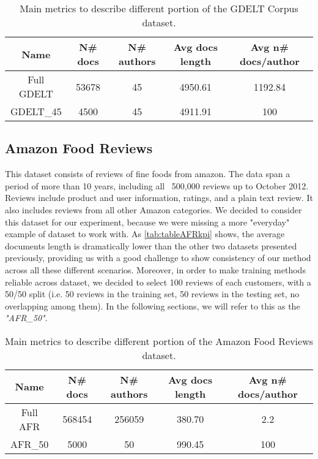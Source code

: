 \begin{table}[h!]
	\begin{center}  
		\caption[GDELT Corpus metrics]{Main metrics to describe different portion of the GDELT Corpus dataset.} 
		\label{tab:tableGDELTkpi}
		\begin{tabular}{|c | c | c | c | c |}
			\hline 
			Name & N\# docs & N\# authors & Avg docs length & Avg n\# docs/author \\
			\hline
			Full GDELT & 53678 & 45 & 4950.61 & 1192.84 \\ \hline
			GDELT\_45 & 4500 & 45 & 4911.91 & 100  \\ \hline
		\end{tabular} 
	\end{center}
\end{table}

\subsection{Amazon Food Reviews}
This dataset consists of reviews of fine foods from amazon. The data span a period of more than 10 years, including all ~500,000 reviews up to October 2012. Reviews include product and user information, ratings, and a plain text review. It also includes reviews from all other Amazon categories.
We decided to consider this dataset for our experiment, because we were missing a more "everyday" example of dataset to work with. As \autoref{tab:tableAFRkpi} shows, the average documents length is dramatically lower than the other two datasets presented previously, providing us with a good challenge to show consistency of our method across all these different scenarios.
Moreover, in order to make training methods reliable across dataset, we decided to select 100 reviews of each customers, with a 50/50 split (i.e. 50 reviews in the training set, 50 reviews in the testing set, no overlapping among them). In the following sections, we will refer to this as the \textit{"AFR\_50"}.

\begin{table}[h!]
	\begin{center}  
		\caption[Amazon Food Reviews Corpus metrics]{Main metrics to describe different portion of the Amazon Food Reviews dataset.} 
		\label{tab:tableAFRkpi}
		\begin{tabular}{|c | c | c | c | c |}
			\hline 
			Name & N\# docs & N\# authors & Avg docs length & Avg n\# docs/author \\
			\hline
			Full AFR & 568454 & 256059 & 380.70 & 2.2 \\ \hline
			AFR\_50 & 5000 & 50 & 990.45 & 100  \\ \hline
		\end{tabular} 
	\end{center}
\end{table}

